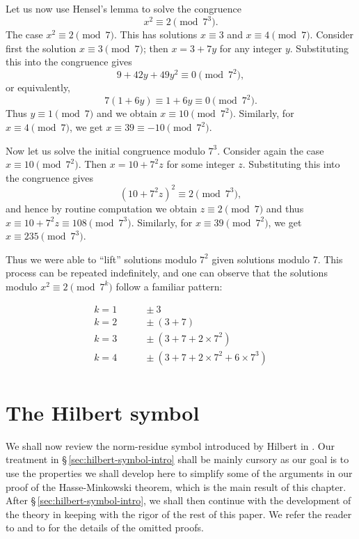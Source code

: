 \smallskip

Let us now use Hensel's lemma to solve the congruence
\[
    x^2 \equiv 2 \pmod{7^3}.  
\]
The case \(x^2 \equiv 2 \pmod{7}\). This has solutions \(x \equiv 3\) and \(x \equiv 4 \pmod{7}\). Consider first the solution \(x \equiv 3 \pmod{7}\); then \(x = 3 + 7y\) for any integer \(y\). Substituting this into the congruence gives
\[
    9 + 42y + 49y^2 \equiv 0 \pmod{7^2},
\]
or equivalently,
\[
    7(1 + 6y) \equiv 1 + 6y \equiv 0 \pmod{7^2}.
\]
Thus \(y \equiv 1 \pmod{7}\) and we obtain \(x \equiv 10 \pmod{7^2}\). Similarly, for \(x \equiv 4 \pmod{7}\), we get \(x \equiv 39 \equiv -10 \pmod{7^2}\).

Now let us solve the initial congruence modulo \(7^3\). Consider again the case \(x \equiv 10 \pmod{7^2}\). Then \(x = 10 + 7^2z\) for some integer \(z\). Substituting this into the congruence gives
\[
    (10+7^2z)^2 \equiv 2 \pmod{7^3},
\]
and hence by routine computation we obtain \(z \equiv 2 \pmod{7}\) and thus \(x \equiv 10 + 7^2z \equiv 108 \pmod{7^3}\). Similarly, for \(x \equiv 39 \pmod{7^2}\), we get \(x \equiv 235 \pmod{7^3}\).

Thus we were able to ``lift'' solutions modulo \(7^2\) given solutions modulo \(7\). This process can be repeated indefinitely, and one can observe that the solutions modulo \(x^2 \equiv 2 \pmod{7^k}\) follow a familiar pattern:

\begin{align*}
    k = 1 & \qquad \pm 3 \\
    k = 2 & \qquad \pm (3 + 7) \\
    k = 3 & \qquad \pm (3 + 7 + 2 \times 7^2) \\
    k = 4 & \qquad \pm (3 + 7 + 2 \times 7^2 + 6 \times 7^3) \\
\end{align*}

\section{The Hilbert symbol}\label{sec:hilbert-symbol}

We shall now review the norm-residue symbol introduced by Hilbert in \cite[pp.~286--287]{hilbert1932theorie}. Our treatment in \S\,\ref{sec:hilbert-symbol-intro} shall be mainly cursory as our goal is to use the properties we shall develop here to simplify some of the arguments in our proof of the Hasse-Minkowski theorem, which is the main result of this chapter. After \S\,\ref{sec:hilbert-symbol-intro}, we shall then continue with the development of the theory in keeping with the rigor of the rest of this paper.  We refer the reader to \cite{serre2012course} and to \cite{sutherland2013introduction10} for the details of the omitted proofs.

